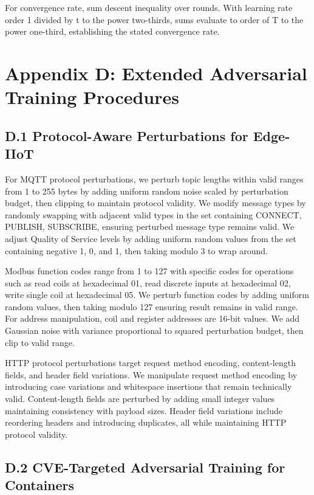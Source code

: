 \documentclass[12pt,a4paper]{article}
\theoremstyle{definition}
\begin{document}
\par\endgroup


For convergence rate, sum descent inequality over rounds. With learning rate order 1 divided by t to the power two-thirds, sums evaluate to order of T to the power one-third, establishing the stated convergence rate.

\section{Appendix D: Extended Adversarial Training Procedures}

\subsection{D.1 Protocol-Aware Perturbations for Edge-IIoT}

For MQTT protocol perturbations, we perturb topic lengths within valid ranges from 1 to 255 bytes by adding uniform random noise scaled by perturbation budget, then clipping to maintain protocol validity. We modify message types by randomly swapping with adjacent valid types in the set containing CONNECT, PUBLISH, SUBSCRIBE, ensuring perturbed message type remains valid. We adjust Quality of Service levels by adding uniform random values from the set containing negative 1, 0, and 1, then taking modulo 3 to wrap around.

Modbus function codes range from 1 to 127 with specific codes for operations such as read coils at hexadecimal 01, read discrete inputs at hexadecimal 02, write single coil at hexadecimal 05. We perturb function codes by adding uniform random values, then taking modulo 127 ensuring result remains in valid range. For address manipulation, coil and register addresses are 16-bit values. We add Gaussian noise with variance proportional to squared perturbation budget, then clip to valid range.

HTTP protocol perturbations target request method encoding, content-length fields, and header field variations. We manipulate request method encoding by introducing case variations and whitespace insertions that remain technically valid. Content-length fields are perturbed by adding small integer values maintaining consistency with payload sizes. Header field variations include reordering headers and introducing duplicates, all while maintaining HTTP protocol validity.

\subsection{D.2 CVE-Targeted Adversarial Training for Containers}
\end{document}
